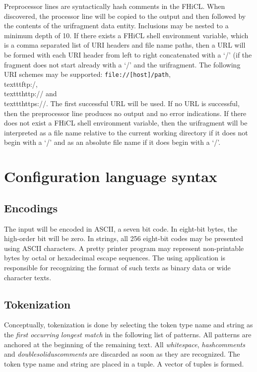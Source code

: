 \documentclass[twoside]{memarticle}
\begin{document}
Preprocessor lines are syntactically hash comments in the FHiCL.
When discovered, the processor line will be copied to the output
and then followed by the contents of the urifragment data entity.
Inclusions may be nested to a minimum depth of 10.
If there exists a FHiCL shell environment variable,
which is a comma separated list of URI headers and file name paths,
then a URL will be formed with each URI header from left to right
concatenated with a `/' (if the fragment does not start already
with a `/' and the urifragment.
The following URI schemes may be supported:
\texttt{file://[host]/path}, \\texttt{ftp:/},
\\texttt{http://} and \\texttt{https://}.
The first successful URL will be used.
If no URL is successful, then the preprocessor line produces no output
and no error indications.
If there does not exist a FHiCL shell environment variable,
then the urifragment will be interpreted as a file name
relative to the current working directory
if it does not begin with a `/' and
as an absolute file name if it does begin with a `/'.

\chapter{Configuration language syntax}

\section{Encodings}

The input will be encoded in ASCII, a seven bit code.
In eight-bit bytes, the high-order bit will be zero.
In strings, all 256 eight-bit codes may be presented using ASCII characters.
A pretty printer program may represent non-printable
bytes by octal or hexadecimal escape sequences.
The using application is responsible for recognizing
the format of such texts as binary data or wide
character texts.

\section{Tokenization}

Conceptually, tokenization is done by selecting the token type name and
string as the {\em first occurring longest match} in the following list
of patterns.
All patterns are anchored at the beginning of the remaining text.
All {\em whitespace}, {\em hashcomments} and {\em doublesoliduscomments}
are discarded as soon as they are recognized.
The token type name and string are placed in a tuple.
A vector of tuples is formed.
\end{document}

